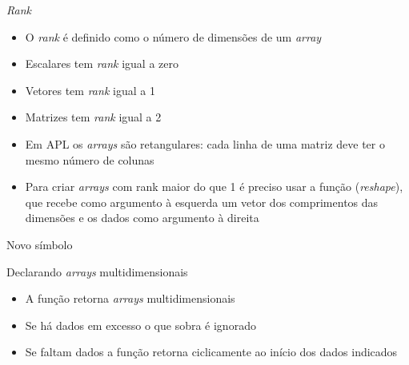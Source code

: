 \begin{frame}[fragile]{\it Rank}

    \begin{itemize}
        \item O \textit{rank} é definido como o número de dimensões de um \textit{array}
        \pause

        \item Escalares tem \textit{rank} igual a zero
        \pause

        \item Vetores tem \textit{rank} igual a 1
        \pause

        \item Matrizes tem \textit{rank} igual a 2
        \pause

        \item Em APL os  \textit{arrays} são retangulares: cada linha de uma matriz deve ter o mesmo número de colunas
        \pause

        \item Para criar \textit{arrays} com rank maior do que 1 é preciso usar a função  (\textit{reshape}), que recebe como argumento à esquerda um vetor dos comprimentos das dimensões e os dados como argumento à direita
    \end{itemize}

\end{frame}

\begin{frame}[fragile]{Novo símbolo}


\end{frame}

\begin{frame}[fragile]{Declarando \textit{arrays} multidimensionais}

    \begin{itemize}
        \item A função  retorna \textit{arrays} multidimensionais
        \pause

        \item Se há dados em excesso o que sobra é ignorado
        \pause

        \item Se faltam dados a função  retorna ciclicamente ao início dos dados indicados
    \end{itemize}

\end{frame}

